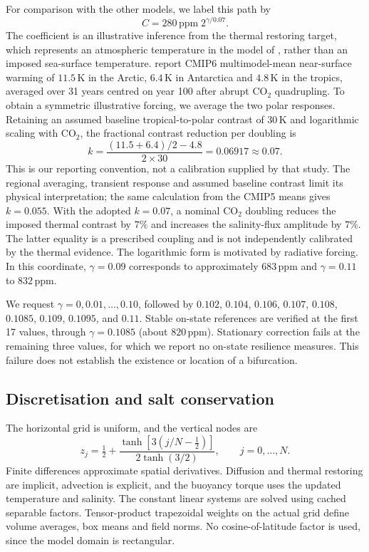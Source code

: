 \documentclass[12pt, a4paper]{article}
\newcommand{\CO}{CO\ensuremath{_2}}
\begin{document}
For comparison with the other models, we label this path by
\begin{equation}
  C=280\,\text{ppm}\;2^{\gamma/0.07}.
  \label{eq:co2_gamma}
\end{equation}
The coefficient is an illustrative inference from the thermal restoring target, which represents an atmospheric temperature in the model of \citet{Soons2025MostLikelyNoiseinduced}, rather than an imposed sea-surface temperature. \citet{Hahn2021PolarAmplification} report CMIP6 multimodel-mean near-surface warming of $11.5\,\mathrm{K}$ in the Arctic, $6.4\,\mathrm{K}$ in Antarctica and $4.8\,\mathrm{K}$ in the tropics, averaged over 31 years centred on year 100 after abrupt \CO{} quadrupling. To obtain a symmetric illustrative forcing, we average the two polar responses. Retaining an assumed baseline tropical-to-polar contrast of $30\,\mathrm{K}$ and logarithmic scaling with \CO{}, the fractional contrast reduction per doubling is
\begin{equation}
  k=\frac{(11.5+6.4)/2-4.8}{2\times30}
   =0.06917\approx0.07.
\end{equation}
This is our reporting convention, not a calibration supplied by that study. The regional averaging, transient response and assumed baseline contrast limit its physical interpretation; the same calculation from the CMIP5 means gives $k=0.055$. With the adopted $k=0.07$, a nominal \CO{} doubling reduces the imposed thermal contrast by $7\%$ and increases the salinity-flux amplitude by $7\%$. The latter equality is a prescribed coupling and is not independently calibrated by the thermal evidence. The logarithmic form is motivated by radiative forcing. In this coordinate, $\gamma=0.09$ corresponds to approximately $683\,\text{ppm}$ and $\gamma=0.11$ to $832\,\text{ppm}$.

We request $\gamma=0,0.01,\ldots,0.10$, followed by $0.102$, $0.104$, $0.106$, $0.107$, $0.108$, $0.1085$, $0.109$, $0.1095$, and $0.11$. Stable on-state references are verified at the first 17 values, through $\gamma=0.1085$ (about $820\,\text{ppm}$). Stationary correction fails at the remaining three values, for which we report no on-state resilience measures. This failure does not establish the existence or location of a bifurcation.

\subsection*{Discretisation and salt conservation}

The horizontal grid is uniform, and the vertical nodes are
\begin{equation}
  z_j=\tfrac12+\frac{\tanh[3(j/N-\tfrac12)]}{2\tanh(3/2)},\qquad j=0,\ldots,N.
  \label{eq:zgrid}
\end{equation}
Finite differences approximate spatial derivatives. Diffusion and thermal restoring are implicit, advection is explicit, and the buoyancy torque uses the updated temperature and salinity. The constant linear systems are solved using cached separable factors. Tensor-product trapezoidal weights on the actual grid define volume averages, box means and field norms. No cosine-of-latitude factor is used, since the model domain is rectangular.
\end{document}
